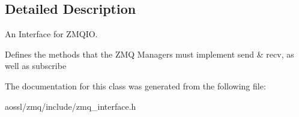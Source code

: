 \subsection{Detailed Description}
An Interface for Z\+M\+Q\+IO. 

Defines the methods that the Z\+MQ Managers must implement send \& recv, as well as subscribe 

The documentation for this class was generated from the following file\+:\begin{DoxyCompactItemize}
\item 
aossl/zmq/include/zmq\+\_\+interface.\+h\end{DoxyCompactItemize}
